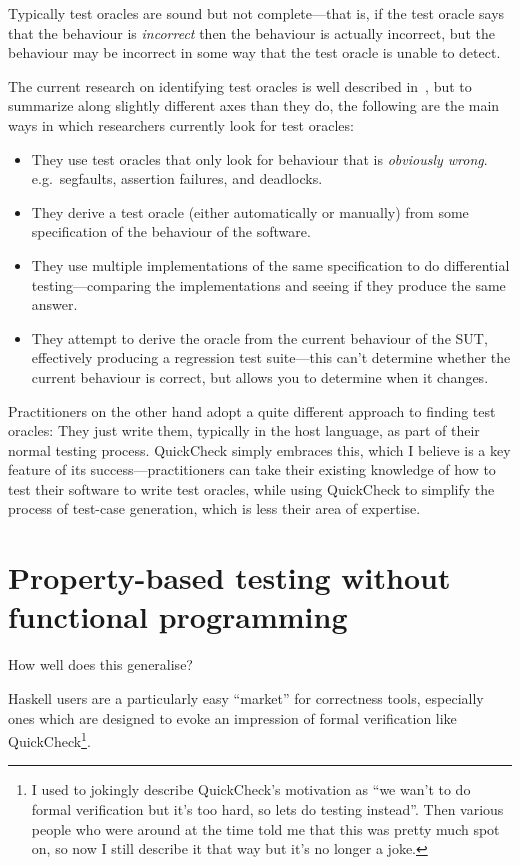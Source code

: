 Typically test oracles are sound but not complete---that is,
if the test oracle says that the behaviour is \emph{incorrect} then the behaviour is actually incorrect,
but the behaviour may be incorrect in some way that the test oracle is unable to detect.

The current research on identifying test oracles is well described in~\cite{DBLP:journals/tse/BarrHMSY15},
but to summarize along slightly different axes than they do,
the following are the main ways in which researchers currently look for test oracles:

\begin{itemize}
\item They use test oracles that only look for behaviour that is \emph{obviously wrong}.
e.g.\ segfaults, assertion failures, and deadlocks.
\item They derive a test oracle (either automatically or manually) from some specification of the behaviour of the software.
\item They use multiple implementations of the same specification to do differential testing---comparing
the implementations and seeing if they produce the same answer.
\item They attempt to derive the oracle from the current behaviour of the SUT,
effectively producing a regression test suite---this
can't determine whether the current behaviour is correct,
but allows you to determine when it changes.
\end{itemize}

Practitioners on the other hand adopt a quite different approach to finding test oracles:
They just write them,
typically in the host language,
as part of their normal testing process.
QuickCheck simply embraces this,
which I believe is a key feature of its success---practitioners
can take their existing knowledge of how to test their software to write test oracles,
while using QuickCheck to simplify the process of test-case generation,
which is less their area of expertise.

\chapter{Property-based testing without functional programming}

How well does this generalise?

Haskell users are a particularly easy ``market'' for correctness tools,
especially ones which are designed to evoke an impression of formal verification like QuickCheck\footnote{
I used to jokingly describe QuickCheck's motivation as ``we wan't to do formal verification but it's too hard, so lets do testing instead''.
Then various people who were around at the time told me that this was pretty much spot on,
so now I still describe it that way but it's no longer a joke.
}.

